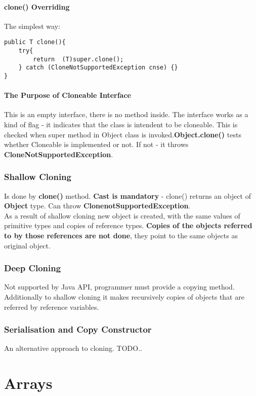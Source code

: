 \documentclass{report}
\begin{document}
\subsubsection{clone() Overriding}
The simplest way:
\begin{verbatim}
public T clone(){
    try{
        return  (T)super.clone();
    } catch (CloneNotSupportedException cnse) {}
}
\end{verbatim}

\subsubsection{The Purpose of Cloneable Interface}
This is an empty interface, there is no method inside. The interface works as a kind of flag - it indicates that the class is intendent to be cloneable.
This is checked when super method in Object class is invoked.\textbf{Object.clone()} tests whether Cloneable is implemented or not. If not -
it throws \textbf{CloneNotSupportedException}.

\subsection{Shallow Cloning}
Is done by \textbf{clone()} method. \textbf{Cast is mandatory} - clone() returns an object of \textbf{Object} type.
Can throw \textbf{ClonenotSupportedException}. \\
As a result of shallow cloning new object is created, with the same values of primitive types and copies of reference types. \textbf{Copies of the objects referred to by those references are not done}, they point to the same objects as original object.

\subsection{Deep Cloning}
Not supported by Java API, programmer must provide a copying method. Additionally to shallow cloning it makes recursively copies of objects that are referred by reference variables.

\subsection{Serialisation and Copy Constructor}
An alternative approach to cloning. TODO..


\chapter{Arrays}
\end{document}
